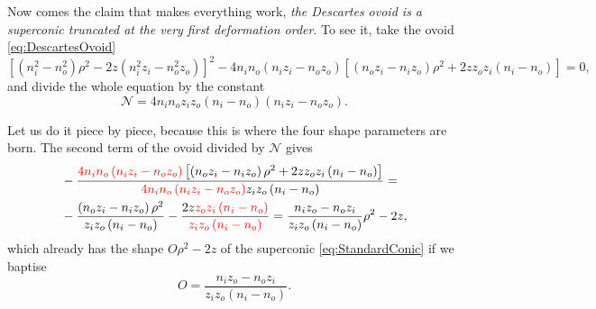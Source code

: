                 Now comes the claim that makes everything work, \textit{the Descartes ovoid is a superconic truncated at the very first deformation order}. To see it, take the ovoid \ref{eq:DescartesOvoid}
                \begin{equation*}
                    \left[ \left(n_i^2-n_o^2\right)\rho^2 - 2z\left( n_i^2z_i - n_o^2z_o \right) \right]^2 - 4n_in_o \left( n_iz_i - n_oz_o \right)\left[ \left( n_oz_i - n_iz_o \right)\rho^2 + 2zz_oz_i\left(n_i - n_o\right) \right]=0,
                \end{equation*}
                and divide the whole equation by the constant
                \begin{equation}\label{eq:OvoidNormaliser}
                    \mathcal{N} = 4n_in_oz_iz_o\left( n_i-n_o \right)\left( n_iz_i - n_oz_o \right).
                \end{equation}

                Let us do it piece by piece, because this is where the four shape parameters are born. The second term of the ovoid divided by $\mathcal{N}$ gives
                \begin{align*}
                    & -\frac{ {\color{red} 4n_in_o \left( n_iz_i - n_oz_o \right)} \left[ \left( n_oz_i - n_iz_o \right)\rho^2 + 2zz_oz_i\left(n_i - n_o\right) \right]}{ {\color{red} 4n_in_o\left( n_iz_i - n_oz_o \right)}z_iz_o\left( n_i-n_o \right)} = \\
                    & -\frac{\left( n_oz_i - n_iz_o \right)\rho^2}{z_iz_o\left( n_i-n_o \right)} - \frac{2z {\color{red} z_oz_i\left(n_i-n_o\right)}}{ {\color{red} z_iz_o\left( n_i-n_o \right)}} = \frac{n_iz_o - n_oz_i}{z_iz_o\left(n_i - n_o\right)}\rho^2 - 2z,
                \end{align*}
                which already has the shape $O\rho^2 - 2z$ of the superconic \ref{eq:StandardConic} if we baptise
                \begin{equation}\label{eq:ShapeO}
                    O = \frac{n_iz_o - n_oz_i}{z_iz_o\left(n_i-n_o\right)}.
                \end{equation}

